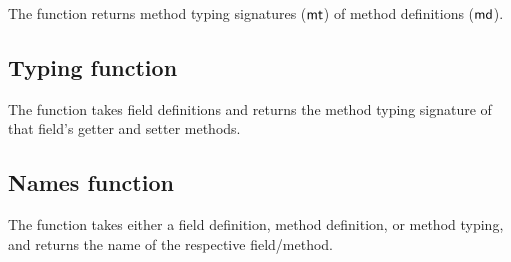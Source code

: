 \documentclass[acmlarge, anonymous, authordraft]{acmart}
\begin{document}
The  function returns method typing signatures ($\mt$) of method definitions ($\md$).

\begin{mathpar}



\end{mathpar}

\subsection{Typing function}

The  function takes field definitions and returns the method typing signature of that field's getter and setter methods. 

\begin{mathpar}
\end{mathpar}

\subsection{Names function}

The  function takes either a field definition, method definition, or method typing, and returns the name of the respective
field/method.

\begin{mathpar}
\end{mathpar}

\begin{mathpar}
\end{mathpar}

\begin{mathpar}


\end{mathpar}
\end{document}
